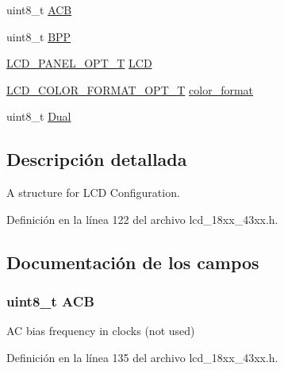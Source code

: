 \begin{DoxyCompactItemize}
\item 
uint8\+\_\+t \hyperlink{struct_l_c_d___c_o_n_f_i_g___t_a353625a29925ab4a63eef4021ac31fcd}{A\+CB}
\item 
uint8\+\_\+t \hyperlink{struct_l_c_d___c_o_n_f_i_g___t_a1bf122d4f2dbe04ec8a49156b2160237}{B\+PP}
\item 
\hyperlink{group___l_c_d__18_x_x__43_x_x_gaceee4b8b7afdc1a97b365dc2feb4ecca}{L\+C\+D\+\_\+\+P\+A\+N\+E\+L\+\_\+\+O\+P\+T\+\_\+T} \hyperlink{struct_l_c_d___c_o_n_f_i_g___t_a6182e9709ca338d887f449d63a6c14aa}{L\+CD}
\item 
\hyperlink{group___l_c_d__18_x_x__43_x_x_gac365c31cd880844cf31747394cd0f93a}{L\+C\+D\+\_\+\+C\+O\+L\+O\+R\+\_\+\+F\+O\+R\+M\+A\+T\+\_\+\+O\+P\+T\+\_\+T} \hyperlink{struct_l_c_d___c_o_n_f_i_g___t_aadb2e5039095d6abbaf48223bce5b85c}{color\+\_\+format}
\item 
uint8\+\_\+t \hyperlink{struct_l_c_d___c_o_n_f_i_g___t_a7a2b46e84c2d72ac3185e3451bfcf2eb}{Dual}
\end{DoxyCompactItemize}


\subsection{Descripción detallada}
A structure for L\+CD Configuration. 

Definición en la línea 122 del archivo lcd\+\_\+18xx\+\_\+43xx.\+h.



\subsection{Documentación de los campos}
\subsubsection[{\texorpdfstring{A\+CB}{ACB}}]{\setlength{\rightskip}{0pt plus 5cm}uint8\+\_\+t A\+CB}\hypertarget{struct_l_c_d___c_o_n_f_i_g___t_a353625a29925ab4a63eef4021ac31fcd}{}\label{struct_l_c_d___c_o_n_f_i_g___t_a353625a29925ab4a63eef4021ac31fcd}
AC bias frequency in clocks (not used) 

Definición en la línea 135 del archivo lcd\+\_\+18xx\+\_\+43xx.\+h.

